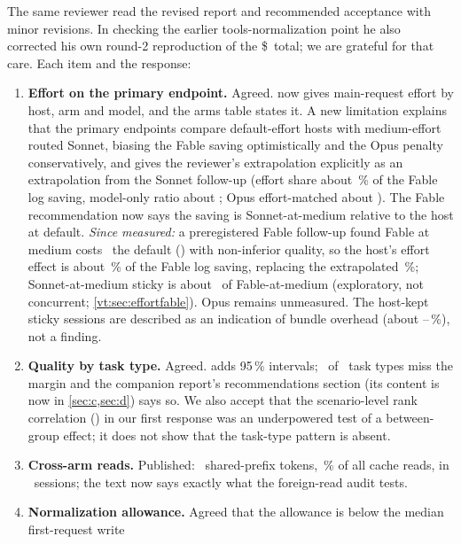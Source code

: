 The same reviewer read the revised report and recommended acceptance with minor revisions. In checking the earlier
tools-normalization point he also corrected his own round-2 reproduction of the \$\ToolsDeltaTotal\ total; we are
grateful for that care. Each item and the response:
\begin{enumerate}[leftmargin=1.6em]
  \item \textbf{Effort on the primary endpoint.} Agreed.  now gives main-request effort by host,
    arm and model, and the arms table states it. A new limitation explains that the primary endpoints compare
    default-effort hosts with medium-effort routed Sonnet, biasing the Fable saving optimistically and the Opus
    penalty conservatively, and gives the reviewer's extrapolation explicitly as an extrapolation from the Sonnet
    follow-up (effort share about \RgEffShareFable\,\% of the Fable log saving, model-only ratio about
    \RgModelOnlyFable; Opus effort-matched about \RgOpusMatched\X). The Fable recommendation now says the saving is
    Sonnet-at-medium relative to the host at default. \emph{Since measured:} a preregistered Fable follow-up found
    Fable at medium costs \EfRatio\X\ the default (\EfCI) with non-inferior quality, so the host's effort effect is
    about \EfShare\,\% of the Fable log saving, replacing the extrapolated \RgEffShareFable\,\%; Sonnet-at-medium sticky
    is about \EfStickyVsMedium\X\ of Fable-at-medium (exploratory, not concurrent; \cref{vt:sec:effortfable}). Opus
    remains unmeasured. The host-kept sticky sessions are
    described as an indication of bundle overhead (about \RgOverheadFable--\RgOverheadOpus\,\%), not a finding.
  \item \textbf{Quality by task type.} Agreed.  adds 95\,\% intervals; \RgNTaskFail\ of \RgNTask\
    task types miss the margin and the companion report's recommendations section (its content is now in \cref{sec:c,sec:d}) says so. We also accept that the scenario-level rank correlation
    (\RvSpearman) in our first response was an underpowered test of a between-group effect; it does not show that
    the task-type pattern is absent.
  \item \textbf{Cross-arm reads.} Published: \RgCrossTokens\ shared-prefix tokens, \RgCrossShare\,\% of all cache
    reads, in \RgCrossSessions\ sessions; the text now says exactly what the foreign-read audit tests.
  \item \textbf{Normalization allowance.} Agreed that the allowance is below the median first-request write

\end{enumerate}

